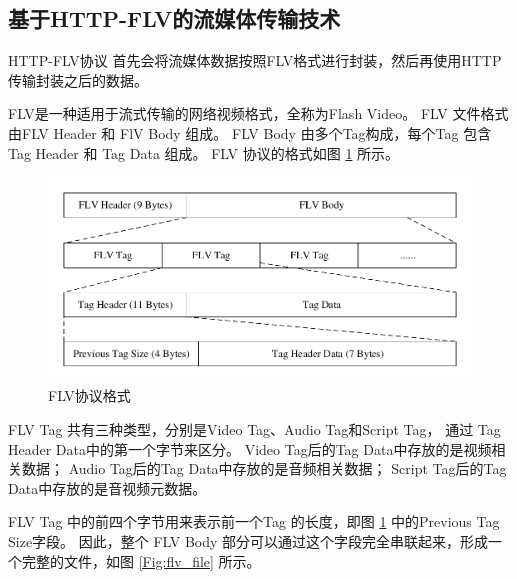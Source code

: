 \newpage
\subsection{基于HTTP-FLV的流媒体传输技术}
HTTP-FLV协议
首先会将流媒体数据按照FLV格式进行封装，然后再使用HTTP传输封装之后的数据。

FLV是一种适用于流式传输的网络视频格式，全称为Flash Video。
FLV 文件格式由FLV Header 和 FlV Body 组成。
FLV Body 由多个Tag构成，每个Tag 包含 Tag Header 和 Tag Data 组成。
FLV 协议的格式如图 \ref{Fig:flv} 所示。

\begin{figure}[ht]
    \centering
    \includegraphics[width=0.8\linewidth]{./Figure/IMG_flv.pdf}
    \caption{FLV协议格式}
    \label{Fig:flv}
\end{figure}

\newpage
FLV Tag 共有三种类型，分别是Video Tag、Audio Tag和Script Tag，
通过 Tag Header Data中的第一个字节来区分。
Video Tag后的Tag Data中存放的是视频相关数据；
Audio Tag后的Tag Data中存放的是音频相关数据；
Script Tag后的Tag Data中存放的是音视频元数据。

FLV Tag 中的前四个字节用来表示前一个Tag 的长度，即图 \ref{Fig:flv} 中的Previous Tag Size字段。
因此，整个 FLV Body 部分可以通过这个字段完全串联起来，形成一个完整的文件，如图 \ref{Fig:flv_file} 所示。

